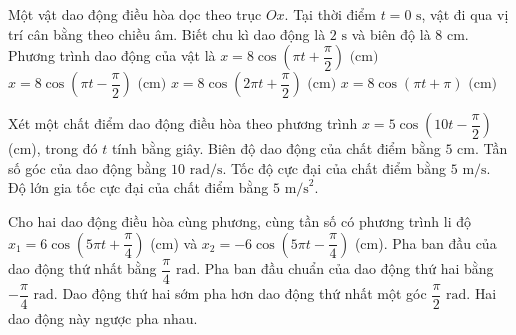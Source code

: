 \begin{ex}
Một vật dao động điều hòa dọc theo trục $Ox$. Tại thời điểm $t = 0\text{ s}$, vật đi qua vị trí cân bằng theo chiều âm. Biết chu kì dao động là $2\text{ s}$ và biên độ là $8\text{ cm}$. Phương trình dao động của vật là
\choice
{\True $x = 8\cos(\pi t + \dfrac{\pi}{2})\text{ (cm)}$}
{$x = 8\cos(\pi t - \dfrac{\pi}{2})\text{ (cm)}$}
{$x = 8\cos(2\pi t + \dfrac{\pi}{2})\text{ (cm)}$}
{$x = 8\cos(\pi t + \pi)\text{ (cm)}$}
\end{ex}

\begin{ex}
Xét một chất điểm dao động điều hòa theo phương trình $x = 5\cos(10t - \dfrac{\pi}{2})$ (cm), trong đó $t$ tính bằng giây.
\choiceTF
{\True Biên độ dao động của chất điểm bằng $5\text{ cm}$.}
{\True Tần số góc của dao động bằng $10\text{ rad/s}$.}
{Tốc độ cực đại của chất điểm bằng $5\text{ m/s}$.}
{\True Độ lớn gia tốc cực đại của chất điểm bằng $5\text{ m/s}^2$.}
\end{ex}

\begin{ex}
Cho hai dao động điều hòa cùng phương, cùng tần số có phương trình li độ $x_1 = 6\cos(5\pi t + \dfrac{\pi}{4})$ (cm) và $x_2 = -6\cos(5\pi t - \dfrac{\pi}{4})$ (cm).
\choiceTF
{\True Pha ban đầu của dao động thứ nhất bằng $\dfrac{\pi}{4}\text{ rad}$.}
{Pha ban đầu chuẩn của dao động thứ hai bằng $-\dfrac{\pi}{4}\text{ rad}$.}
{\True Dao động thứ hai sớm pha hơn dao động thứ nhất một góc $\dfrac{\pi}{2}\text{ rad}$.}
{Hai dao động này ngược pha nhau.}
\end{ex}

